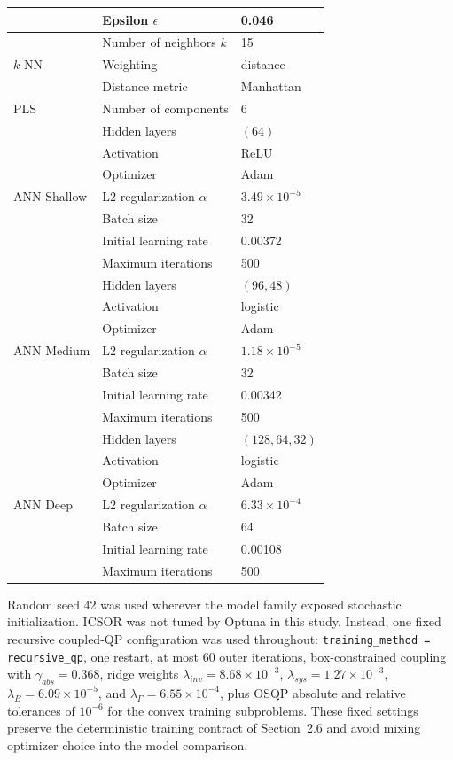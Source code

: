 \documentclass[11pt]{article}
\begin{document}
\begin{table}[htbp]
\begin{tabular}{@{}lll@{}}
 & Epsilon $\epsilon$ & 0.046 \\
\midrule
\multirow{3}{*}{$k$-NN}
 & Number of neighbors $k$ & 15 \\
 & Weighting & distance \\
 & Distance metric & Manhattan \\
\midrule
\multirow{1}{*}{PLS}
 & Number of components & 6 \\
\midrule
\multirow{7}{*}{ANN Shallow}
 & Hidden layers & $(64)$ \\
 & Activation & ReLU \\
 & Optimizer & Adam \\
 & L2 regularization $\alpha$ & $3.49 \times 10^{-5}$ \\
 & Batch size & 32 \\
 & Initial learning rate & 0.00372 \\
 & Maximum iterations & 500 \\
\midrule
\multirow{7}{*}{ANN Medium}
 & Hidden layers & $(96, 48)$ \\
 & Activation & logistic \\
 & Optimizer & Adam \\
 & L2 regularization $\alpha$ & $1.18 \times 10^{-5}$ \\
 & Batch size & 32 \\
 & Initial learning rate & 0.00342 \\
 & Maximum iterations & 500 \\
\midrule
\multirow{7}{*}{ANN Deep}
 & Hidden layers & $(128, 64, 32)$ \\
 & Activation & logistic \\
 & Optimizer & Adam \\
 & L2 regularization $\alpha$ & $6.33 \times 10^{-4}$ \\
 & Batch size & 64 \\
 & Initial learning rate & 0.00108 \\
 & Maximum iterations & 500 \\
\bottomrule
\end{tabular}
\end{table}

Random seed 42 was used wherever the model family exposed stochastic initialization. ICSOR was not tuned by Optuna in this study. Instead, one fixed recursive coupled-QP configuration was used throughout: \texttt{training\_method = recursive\_qp}, one restart, at most 60 outer iterations, box-constrained coupling with $\gamma_{abs} = 0.368$, ridge weights $\lambda_{inv} = 8.68 \times 10^{-3}$, $\lambda_{sys} = 1.27 \times 10^{-3}$, $\lambda_B = 6.09 \times 10^{-5}$, and $\lambda_\Gamma = 6.55 \times 10^{-4}$, plus OSQP absolute and relative tolerances of $10^{-6}$ for the convex training subproblems. These fixed settings preserve the deterministic training contract of Section~2.6 and avoid mixing optimizer choice into the model comparison.
\end{document}
